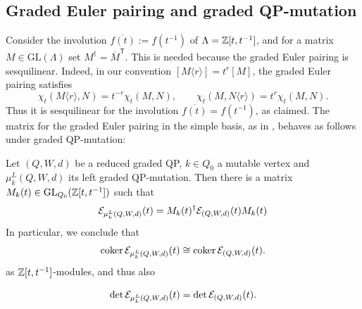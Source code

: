 \subsection{Graded Euler pairing and graded QP-mutation}\label{sec:euler-mutation}
Consider the involution \(\overline{f(t)}:=f(t^{-1})\) of \(\Lambda=\mathbb Z[t,t^{-1}]\), and for a
matrix \(M\in\mbox{GL}(\Lambda)\) set  $M^\dagger=\overline M^{\mathsf T}$. This is needed because the graded Euler pairing is sesquilinear. Indeed, in our convention $[M\langle r\rangle]=t^r[M]$, the graded
Euler pairing satisfies
\[
\chi_t(M\langle r\rangle,N)
=
t^{-r}\chi_t(M,N),
\qquad
\chi_t(M,N\langle r\rangle)
=
t^r\chi_t(M,N).
\]
Thus it is sesquilinear for the involution
$\overline{f(t)}=f(t^{-1})$, as claimed. The matrix for the graded Euler pairing in the simple basis, as in , behaves as follows under graded QP-mutation:

\begin{proposition}\label{prop:mutation-euler}
Let \((Q,W,d)\) be a reduced graded QP, $k\in Q_0$ a mutable vertex and $\mu_k^L(Q,W,d)$ its left graded QP-mutation. Then there is a matrix \(M_k(t)\in\mathrm{GL}_{Q_0}(\mathbb Z[t,t^{-1}])\) such that
\begin{equation}\label{eq:mutation-congruence}
 \mathcal E_{\mu_k^L(Q,W,d)}(t)
 =M_k(t)^\dagger\mathcal E_{(Q,W,d)}(t)M_k(t)
\end{equation}
In particular, we conclude that
\begin{equation}\label{eq:mutation-coker}
 \operatorname{coker}\mathcal E_{\mu_k^L(Q,W,d)}(t)
 \cong\operatorname{coker}\mathcal E_{(Q,W,d)}(t).
\end{equation}
as $\mathbb Z[t,t^{-1}]$-modules, and thus also

\begin{equation}\label{eq:mutation-det}
 \det\mathcal E_{\mu_k^L(Q,W,d)}(t)
 =\det\mathcal E_{(Q,W,d)}(t).
\end{equation}

\end{proposition}


